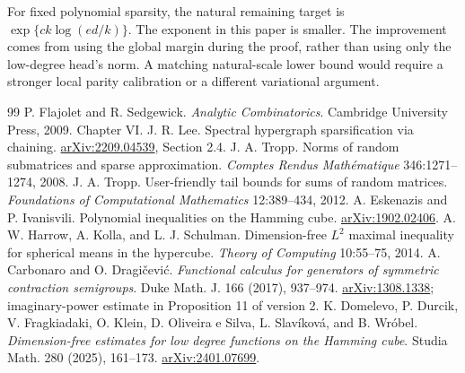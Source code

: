 \documentclass[11pt]{article}
\theoremstyle{remark}\newtheorem{remark}[theorem]{Remark}
\begin{document}
For fixed polynomial sparsity, the natural remaining target is
$\exp\{c k\log(ed/k)\}$. The exponent in this paper is smaller. The
improvement comes from using the global margin during the proof, rather
than using only the low-degree head's norm. A matching natural-scale
lower bound would require a stronger local parity calibration or a
different variational argument.

\begin{thebibliography}{99}
P. Flajolet and R. Sedgewick. \emph{Analytic Combinatorics}.
Cambridge University Press, 2009. Chapter VI.
J. R. Lee. Spectral hypergraph sparsification via chaining.
\href{https://arxiv.org/abs/2209.04539}{arXiv:2209.04539}, Section 2.4.
J. A. Tropp. Norms of random submatrices and sparse approximation.
\emph{Comptes Rendus Math\'ematique} 346:1271--1274, 2008.
J. A. Tropp. User-friendly tail bounds for sums of random matrices.
\emph{Foundations of Computational Mathematics} 12:389--434, 2012.
A. Eskenazis and P. Ivanisvili.
Polynomial inequalities on the Hamming cube.
\href{https://arxiv.org/abs/1902.02406}{arXiv:1902.02406}.
A. W. Harrow, A. Kolla, and L. J. Schulman.
Dimension-free $L^2$ maximal inequality for spherical means in the
hypercube. \emph{Theory of Computing} 10:55--75, 2014.
 A. Carbonaro and O. Dragi\v cevi\'c.
\emph{Functional calculus for generators of symmetric contraction semigroups}.
Duke Math. J. 166 (2017), 937--974.
\href{https://arxiv.org/abs/1308.1338}{arXiv:1308.1338}; imaginary-power estimate in Proposition 11 of version 2.
 K. Domelevo, P. Durcik, V. Fragkiadaki, O. Klein, D. Oliveira e Silva, L. Slav\'ikov\'a, and B. Wr\'obel.
\emph{Dimension-free estimates for low degree functions on the Hamming cube}.
Studia Math. 280 (2025), 161--173.
\href{https://arxiv.org/abs/2401.07699}{arXiv:2401.07699}.

\end{thebibliography}
\end{document}
